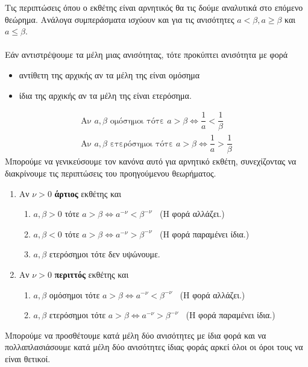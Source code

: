 Τις περιπτώσεις όπου ο εκθέτης είναι αρνητικός θα τις δούμε αναλυτικά στο επόμενο θεώρημα. Ανάλογα συμπεράσματα ισχύουν και για τις ανισότητες $ a<\beta,a\geq\beta $ και $ a\leq\beta $.\\\\
Εάν αντιστρέψουμε τα μέλη μιας ανισότητας, τότε προκύπτει ανισότητα με φορά
\begin{itemize}[itemsep=0mm]
\item αντίθετη της αρχικής αν τα μέλη της είναι ομόσημα
\item ίδια της αρχικής αν τα μέλη της είναι ετερόσημα.
\end{itemize}
\begin{gather*}
\textrm{Αν }a,\beta\textrm{ ομόσημοι τότε } a>\beta\Leftrightarrow \dfrac{1}{a}<\dfrac{1}{\beta}\\
\textrm{Αν }a,\beta\textrm{ ετερόσημοι τότε } a>\beta\Leftrightarrow \dfrac{1}{a}>\dfrac{1}{\beta}
\end{gather*}
Μπορούμε να γενικεύσουμε τον κανόνα αυτό για αρνητικό εκθέτη, συνεχίζοντας να διακρίνουμε τις περιπτώσεις του προηγούμενου θεωρήματος.
\begin{enumerate}[itemsep=0mm]
\item Αν $ \nu>0 $ \textbf{άρτιος} εκθέτης και 
\begin{enumerate}[itemsep=0mm,label=\roman*.]
\item $ a,\beta>0 $ τότε $ a>\beta\Leftrightarrow a^{-\nu}<\beta^{-\nu} \;\;${\footnotesize{ (Η φορά αλλάζει.)}}
\item $ a,\beta<0 $ τότε $ a>\beta\Leftrightarrow a^{-\nu}>\beta^{-\nu} \;\;${\footnotesize{ (Η φορά παραμένει ίδια.)}}
\item $ a,\beta $ ετερόσημοι τότε δεν υψώνουμε.
\end{enumerate}
\item Αν $ \nu>0 $ \textbf{περιττός} εκθέτης και
\begin{enumerate}[itemsep=0mm,label=\roman*.]
\item $ a,\beta $ ομόσημοι τότε $ a>\beta\Leftrightarrow a^{-\nu}<\beta^{-\nu} \;\;${\footnotesize{ (Η φορά αλλάζει.)}}
\item $ a,\beta $ ετερόσημοι τότε $ a>\beta\Leftrightarrow a^{-\nu}>\beta^{-\nu} \;\;${\footnotesize{ (Η φορά παραμένει ίδια.)}}
\end{enumerate}
\end{enumerate}
Μπορούμε να προσθέτουμε κατά μέλη δύο ανισότητες με ίδια φορά και να πολλαπλασιάσουμε κατά μέλη δύο ανισότητες ίδιας φοράς αρκεί όλοι οι όροι τους να είναι θετικοί.
